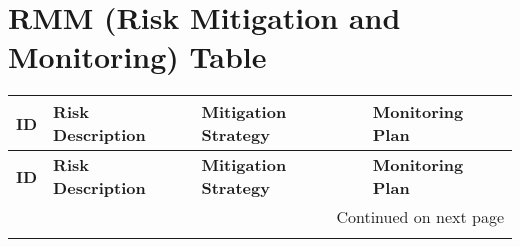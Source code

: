\documentclass{article}
\begin{document}
\section{RMM (Risk Mitigation and Monitoring) Table}
\begin{longtable}{|p{0.5cm}|p{4cm}|p{5cm}|p{5cm}|}
    \hline
    \rowcolor{lightgray}
    \textbf{ID} & \textbf{Risk Description} & \textbf{Mitigation Strategy} & \textbf{Monitoring Plan} \\
    \hline
    \endfirsthead
    
    \hline
    \rowcolor{lightgray}
    \textbf{ID} & \textbf{Risk Description} & \textbf{Mitigation Strategy} & \textbf{Monitoring Plan} \\
    \hline
    \endhead
    
    \hline \multicolumn{4}{|r|}{{Continued on next page}} \\ \hline
    \endfoot
    
    \hline
    \endlastfoot


\end{longtable}
\end{document}
